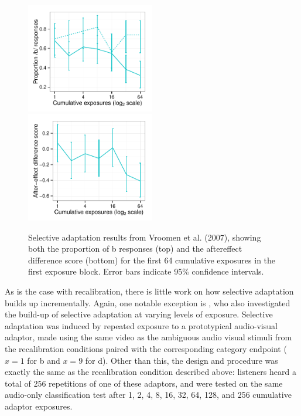 \begin{figure}[htb]
  \centering
  \includegraphics[width=0.5\textwidth]{vroomen-bd-selad-first-64.pdf}
  \includegraphics[width=0.5\textwidth]{vroomen-ae-selad-first-64.pdf}
  \caption{Selective adaptation results from Vroomen et al. (2007), showing both the proportion of \ph b responses (top) and the aftereffect difference score (bottom) for the first 64 cumulative exposures in the first exposure block. Error bars indicate 95\% confidence intervals.}
  \label{fig:vroomen-results-64-selad}
\end{figure}

As is the case with recalibration, there is little work on how selective adaptation builds up incrementally.  Again, one notable exception is \textcite{Vroomen2007}, who also investigated the build-up of selective adaptation at varying levels of exposure.  Selective adaptation was induced by repeated exposure to a prototypical audio-visual adaptor, made using the same video as the ambiguous audio visual stimuli from the recalibration conditions paired with the corresponding category endpoint ($x=1$ for \ph b and $x=9$ for \ph d).  Other than this, the design and procedure was exactly the same as the recalibration condition described above: listeners heard a total of 256 repetitions of one of these adaptors, and were tested on the same audio-only classification test after 1, 2, 4, 8, 16, 32, 64, 128, and 256 cumulative adaptor exposures.

